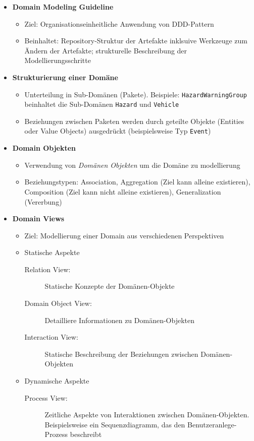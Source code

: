 \begin{itemize}
	\item \textbf{Domain Modeling Guideline}
	\begin{itemize}
		\item Ziel: Organisationseinheitliche Anwendung von DDD-Pattern
		\item Beinhaltet: Repository-Struktur der Artefakte inklsuive Werkzeuge zum Ändern der Artefakte; strukturelle Beschreibung der Modellierungsschritte
	\end{itemize}
	\item \textbf{Strukturierung einer Domäne}
	\begin{itemize}
		\item Unterteilung in Sub-Domänen (Pakete). Beispiele: \texttt{HazardWarningGroup} beinhaltet die Sub-Domänen \texttt{Hazard} und \texttt{Vehicle}
		\item Beziehungen zwischen Paketen werden durch geteilte Objekte (Entities oder Value Objects) ausgedrückt (beispielsweise Typ \texttt{Event})
	\end{itemize}
	\item \textbf{Domain Objekten}
	\begin{itemize}
		\item Verwendung von \textit{Domänen Objekten} um die Domäne zu modellierung
		\item Beziehungstypen: Association, Aggregation (Ziel kann alleine existieren), Composition (Ziel kann nicht alleine existieren), Generalization (Vererbung)
	\end{itemize}
	\item \textbf{Domain Views}
	\begin{itemize}
		\item Ziel: Modellierung einer Domain aus verschiedenen Perspektiven
		\item Statische Aspekte
		\begin{description}
			\item[Relation View:] Statische Konzepte der Domänen-Objekte
			\item[Domain Object View:] Detailliere Informationen zu Domänen-Objekten
			\item[Interaction View:] Statische Beschreibung der Beziehungen zwischen Domänen-Objekten
		\end{description}
		\item Dynamische Aspekte
		\begin{description}
			\item[Process View:] Zeitliche Aspekte von Interaktionen zwischen Domänen-Objekten. Beispielsweise ein Sequenzdiagramm, das den Benutzeranlege-Prozess beschreibt
		\end{description}
	\end{itemize}
\end{itemize}



